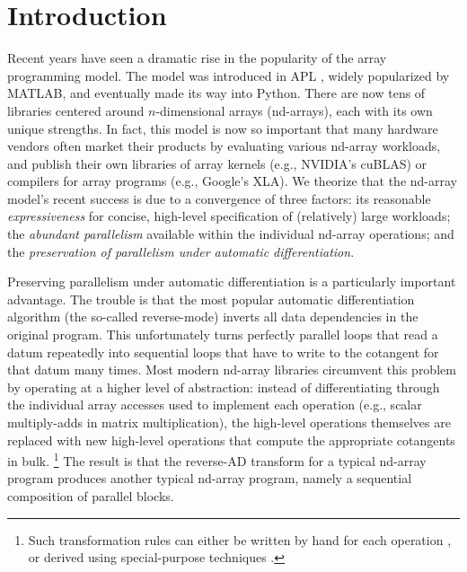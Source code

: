 \documentclass[acmsmall,screen,nonacm]{acmart}
\begin{document}


\maketitle


\section{Introduction}
\label{sec:introduction}

Recent years have seen a dramatic rise in the popularity of the array  programming model.
The model was introduced in APL \cite{iverson1962apl}, widely popularized by MATLAB, and eventually made its way into Python. There are now tens of libraries centered around $n$-dimensional arrays (nd-arrays), each with its own unique strengths.
In fact, this model is now so important that many hardware vendors often market their products by evaluating various nd-array workloads, and publish their own libraries of array kernels (e.g., NVIDIA's cuBLAS) or compilers for array programs (e.g., Google's XLA).
We theorize that the nd-array model's recent success is due to a convergence of three factors: its reasonable \emph{expressiveness} for concise, high-level specification of (relatively) large workloads; the \emph{abundant parallelism} available within the individual nd-array operations; and the \emph{preservation of parallelism under automatic differentiation}.

Preserving parallelism under automatic differentiation is a particularly important advantage.
The trouble is that the most popular automatic differentiation algorithm (the so-called reverse-mode) inverts all data dependencies in the original program.
This unfortunately turns perfectly parallel loops that read a datum repeatedly into sequential loops that have to write to the cotangent for that datum many times.
Most modern nd-array libraries circumvent this problem by operating at a higher level of abstraction: instead of differentiating through the individual array accesses used to implement each operation (e.g., scalar multiply-adds in matrix multiplication), the high-level operations themselves are replaced with new high-level operations that compute the appropriate cotangents in bulk.%
\footnote{Such transformation rules can either be written by hand for each operation \cite{jax2018github}, or derived using special-purpose techniques \citep{huckelheim2019automatic}.}
The result is that the reverse-AD transform for a typical nd-array program produces another typical nd-array program, namely a sequential composition of parallel blocks.
\end{document}
